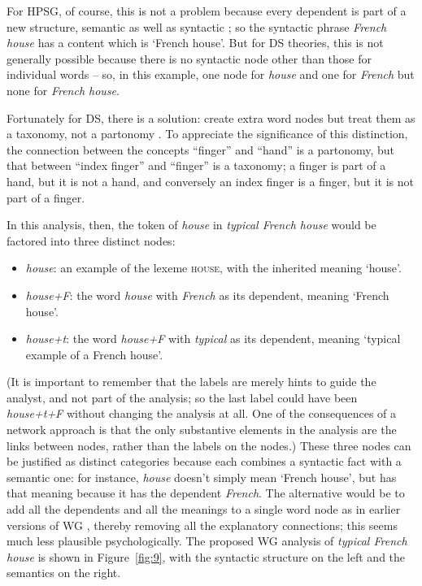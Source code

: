 \documentclass[output=paper]{langscibook}
\begin{document}
For HPSG, of course, this is not a problem because every dependent is part of a new structure, semantic as well as syntactic \citep{MuellerEvaluating}; so the syntactic phrase \emph{French house} has a content which is ‘French house’. But for DS theories, this is not generally possible because there is no syntactic node other than those for individual words – so, in this example, one node for \emph{house} and one for \emph{French} but none for \emph{French house}.

Fortunately for DS, there is a solution: create extra word nodes but treat them as a taxonomy, not a partonomy \citep{Hudson2017a}. To appreciate the significance of this distinction, the connection between the concepts ``finger'' and ``hand'' is a partonomy, but that between ``index finger'' and ``finger'' is a taxonomy; a finger is part of a hand, but it is not a hand, and conversely an index finger is a finger, but it is not part of a finger.

In this analysis, then, the token of \emph{house} in \emph{typical French house} would be factored into three distinct nodes:

\begin{itemize}
	\item \emph{house}: \label{it:house} an example of the lexeme \textsc{house}, with the inherited meaning ‘house’.
	
	\item \emph{house+F}: \label{it:house+f} the word \emph{house} with \emph{French} as its dependent, meaning ‘French house’.
	
	\item \emph{house+t}: \label{it:house+t} the word \emph{house+F} with \emph{typical} as its dependent, meaning ‘typical example of a French house’.
\end{itemize}

(It is important to remember that the labels are merely hints to guide the analyst, and not part of the analysis; so the last label could have been \emph{house+t+F} without changing the analysis at all. One of the consequences of a network approach is that the only substantive elements in the analysis are the links between nodes, rather than the labels on the nodes.) These three nodes can be justified as distinct categories because each combines a syntactic fact with a semantic one: for instance, \emph{house} doesn’t simply mean ‘French house’, but has that meaning because it has the dependent \emph{French}. The alternative would be to add all the dependents and all the meanings to a single word node as in earlier versions of WG \citep[146–151]{Hudson90a-u}, thereby removing all the explanatory connections; this seems much less plausible psychologically. The proposed WG analysis of \emph{typical French house} is shown in Figure~\ref{fig:9}, with the syntactic structure on the left and the semantics on the right.
\end{document}

